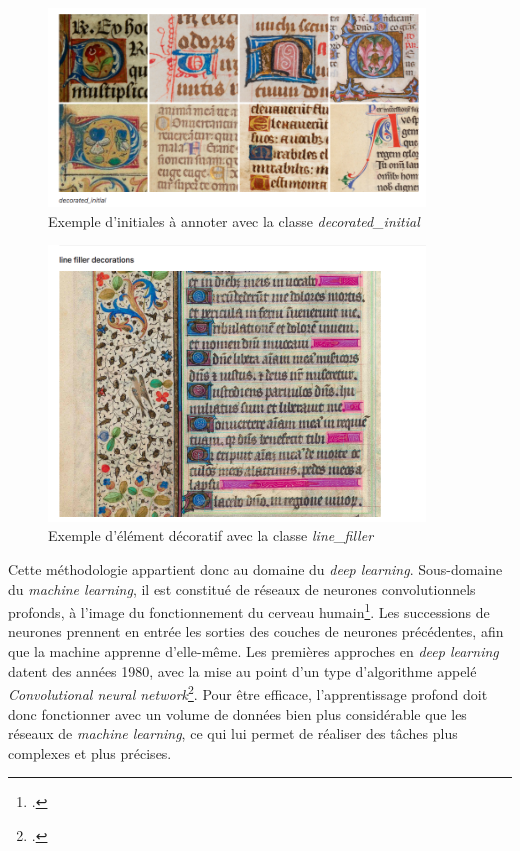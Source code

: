 \documentclass[a4paper,12pt,twoside]{book}
\begin{document}
    \begin{figure}[!h]
    \centering
    \includegraphics[width=10cm]{img/ML/decorated_initial.png}
    \caption{Exemple d'initiales à annoter avec la classe \textit{decorated\_initial}}
    \end{figure}
	
	\begin{figure}[!h]
    \centering
    \includegraphics[width=10cm]{img/ML/line_filler.png}
    \caption{Exemple d'élément décoratif avec la classe \textit{line\_filler}}
    \end{figure}
    
    Cette méthodologie appartient donc au domaine du \textit{deep learning}. Sous-domaine du \textit{machine learning}, il est constitué de réseaux de neurones convolutionnels profonds, à l'image du fonctionnement du cerveau humain\footcite[p. 68-69]{deep_convolutional_neural_networks}. Les successions de neurones prennent en entrée les sorties des couches de neurones précédentes, afin que la machine apprenne d'elle-même. Les premières approches en \textit{deep learning} datent des années 1980, avec la mise au point d'un type d'algorithme appelé \textit{Convolutional neural network}\footcite[p. 1-3]{deep_convolutional_neural_networks}. Pour être efficace, l'apprentissage profond doit donc fonctionner avec un volume de données bien plus considérable que les réseaux de \textit{machine learning}, ce qui lui permet de réaliser des tâches plus complexes et plus précises.
    
\end{document}
